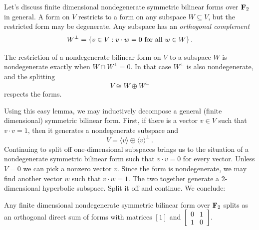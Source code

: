 Let's discuss finite dimensional 
nondegenerate symmetric bilinear forms over $\mathbf F_2$ in general.
A form on $V$ restricts to a form on any subspace $W\subseteq V$, but the 
restricted form may be degenerate. Any subspace has an 
{\em orthogonal complement} 
\[
W^\perp=\{v\in V:v\cdot w=0\,\,\hbox{for all}\,\,w\in W\} \,.
\]
\begin{lemma} The restriction of a nondegenerate bilinear form on $V$ to
a subspace $W$ is nondegenerate exactly when $W\cap W^\perp=0$. In that
case $W^\perp$ is also nondegenerate, and the splitting
\[
V\cong W\oplus W^\perp
\]
respects the forms. 
\end{lemma}
Using this easy lemma, we may inductively decompose a general (finite 
dimensional) symmetric bilinear form. First, if there is a vector $v\in V$
such that $v\cdot v=1$, then it generates a nondegenerate subspace and 
\[
V=\langle v\rangle\oplus\langle v\rangle^\perp\,.
\]
Continuing to split off one-dimensional subspaces brings us to the situation
of a nondegenerate symmetric bilinear form such that $v\cdot v=0$ for every
vector. Unless $V=0$ we can pick a nonzero vector $v$. Since the form is
nondegenerate, we may find another vector $w$ such that $v\cdot w=1$. The
two together generate a 2-dimensional hyperbolic subspace. Split it off 
and continue. We conclude:
\begin{prop} Any finite dimensional nondegenerate symmetric bilinear form
over $\mathbf F_2$ 
splits as an orthogonal direct sum of forms with matrices $[1]$ and 
$\left[\begin{array}{cc}0&1\\1&0\end{array}\right]$.
\end{prop}

